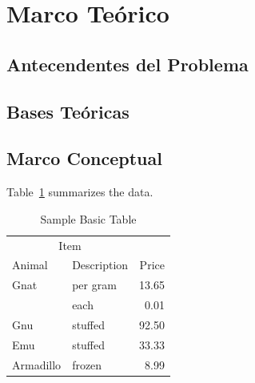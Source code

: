 \section{Marco Teórico}

\subsection{Antecendentes del Problema}

\lipsum[15]

\lipsum[15]

\subsection{Bases Teóricas}

\lipsum[2]

\subsection{Marco Conceptual}

Table~\ref{tab:BasicTable} summarizes the data. \lipsum[15]

\begin{table}
  \caption{Sample Basic Table}
  \label{tab:BasicTable}
  \begin{tabular}{@{}llr@{}}         \toprule
  \multicolumn{2}{c}{Item}        \\ \cmidrule(r){1-2}
  Animal    & Description & Price \\ \midrule
  Gnat      & per gram    & 13.65 \\
            & each        &  0.01 \\
  Gnu       & stuffed     & 92.50 \\
  Emu       & stuffed     & 33.33 \\
  Armadillo & frozen      &  8.99 \\ \bottomrule
  \end{tabular}
\end{table}

